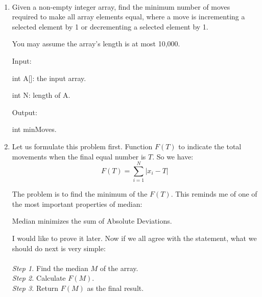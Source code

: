 \documentclass[12pt,a4paper]{article}
\makeatletter
\newtheorem*{solution}{Solution}
\renewenvironment{solution}[1][Solution] {\par\pushQED{\qed}\normalfont\topsep6\p@\@plus6\p@\relax\trivlist\item[\hskip\labelsep\bfseries#1\@addpunct{.}]\ignorespaces}{\popQED\endtrivlist\@endpefalse} \makeatother
\makeatother
\begin{document}
\noindent

\noindent{}


~\\
\begin{enumerate}

\item Given a non-empty integer array, find the minimum number of moves required to make all array elements equal, where a move is incrementing a selected element by 1 or decrementing a selected element by 1.

You may assume the array's length is at most 10,000.

Input:

int A[]: the input array.

int N: length of A.

Output:

int minMoves.


\begin{solution}
Let us formulate this problem first. Function $F(T)$ to indicate the total movements when the final equal number is $T$. So we have:\\
\begin{equation*}
F(T)= \sum_{i=1}^{N}|x_i-T|
\end{equation*}

The problem is to find the minimum of the $F(T)$. This reminds me of one of the most important properties of median: \begin{bf}{Median minimizes the sum of Absolute Deviations}. \end{bf} I would like to prove it later. Now if we all agree with the statement, what we should do next is very simple:\\\\
\emph{Step 1.} Find the median $M$ of the array.\\
\emph{Step 2.} Calculate $F(M)$.\\
\emph{Step 3.} Return $F(M)$ as the final result.\\


\end{solution}
\end{enumerate}
\end{document}

